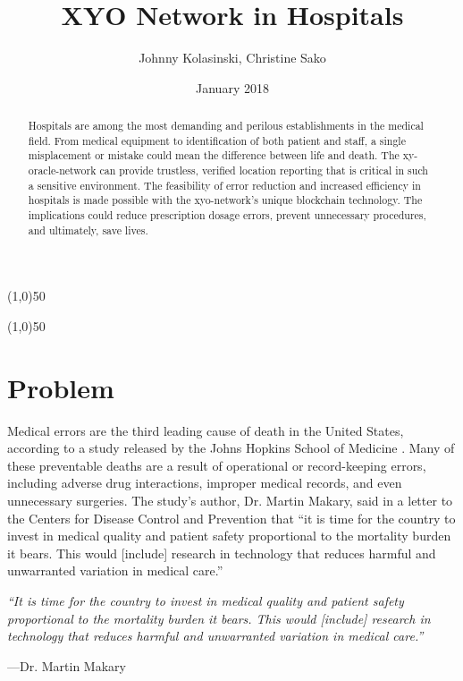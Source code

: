 \documentclass{article}
\title {XYO Network in Hospitals}
\author{Johnny Kolasinski, Christine Sako}
\date{January 2018}
\begin{document}
\maketitle
\tableofcontents

\begin{center}
\line(1,0){50}
\end{center}

\begin{abstract}
Hospitals are among the most demanding and perilous establishments in the medical field. From medical equipment to identification of both patient and staff, a single misplacement or mistake could mean the difference between life and death. The \Gls{xy-oracle-network} can provide \gls{trustless}, verified location reporting that is critical in such a sensitive environment. The feasibility of error reduction and increased efficiency in hospitals is made possible with the \Gls{xyo-network}'s unique blockchain technology. The implications could reduce prescription dosage errors, prevent unnecessary procedures, and ultimately, save lives.

\end{abstract}

\begin{center}
\line(1,0){50}
\end{center}

\section {Problem}
Medical errors are the third leading cause of death in the United States, according to a study released by the Johns Hopkins School of Medicine \cite{sternberg-medicalerrors}. Many of these preventable deaths are a result of operational or record-keeping errors, including adverse drug interactions, improper medical records, and even unnecessary surgeries. The study's author, Dr. Martin Makary, said in a letter to the Centers for Disease Control and Prevention that ``it is time for the country to invest in medical quality and patient safety proportional to the mortality burden it bears. This would [include] research in technology that reduces harmful and unwarranted variation in medical care.''

\begin{displayquote}\textit{``It is time for the country to invest in medical quality and patient safety proportional to the mortality burden it bears. This would [include] research in technology that reduces harmful and unwarranted variation in medical care.''}

\vspace{2mm}
---Dr. Martin Makary
\end{displayquote}
\end{document}
